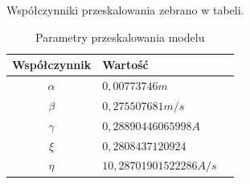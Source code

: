 Współczynniki przeskalowania zebrano w tabeli.

\begin{table}[!htb]
  \centering
  \begin{tabular}{|c|l|l|}
  \hline
  Współczynnik & Wartość \\
  \hline
  $\alpha$ & $0,00773746 m$ \\
  \hline
  $\beta$ & $0,275507681 m/s$ \\
  \hline
  $\gamma$ & $0,28890446065998 A$ \\
  \hline
  $\xi$ & $0,2808437120924$ \\
  \hline
  $\eta$ & $10,28701901522286 A/s$ \\
  \hline
  \end{tabular}
  \caption{Parametry przeskalowania modelu}
  \label{tab:idf}
\end{table}


